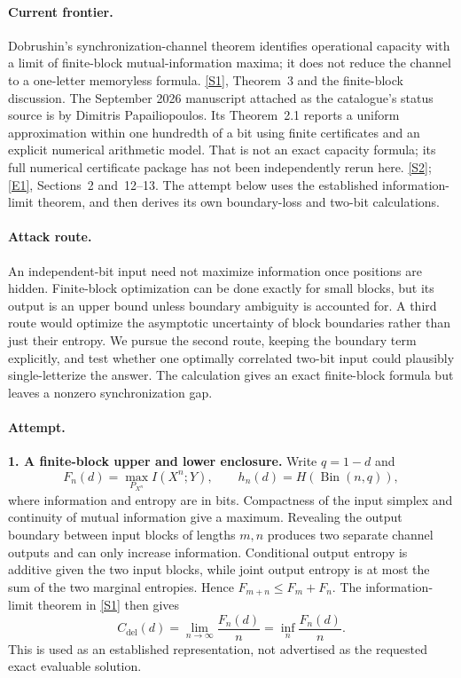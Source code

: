 \documentclass[11pt,a4paper]{article}
\newcommand{\sref}[2]{\hyperlink{source:#1:#2}{[S#2]}}
\newcommand{\eref}[2]{\hyperlink{extra:#1:#2}{[E#2]}}
\numberwithin{equation}{section}
\begin{document}
\paragraph{Current frontier.}
Dobrushin's synchronization-channel theorem identifies operational
capacity with a limit of finite-block mutual-information maxima; it
does not reduce the channel to a one-letter memoryless formula.
\sref{225}{1}, Theorem~3 and the finite-block discussion.
The September 2026 manuscript attached as the catalogue's status source
is by Dimitris Papailiopoulos. Its Theorem~2.1 reports a uniform
approximation within one hundredth of a bit using finite certificates
and an explicit numerical arithmetic model. That is not an exact capacity
formula; its full numerical certificate package has not been independently
rerun here. \sref{225}{2}; \eref{225}{1}, Sections~2 and~12--13.
The attempt below uses the established information-limit theorem, and
then derives its own boundary-loss and two-bit calculations.

\paragraph{Attack route.}
An independent-bit input need not maximize information once positions
are hidden. Finite-block optimization can be done exactly for small
blocks, but its output is an upper bound unless boundary ambiguity is
accounted for. A third route would optimize the asymptotic uncertainty
of block boundaries rather than just their entropy. We pursue the
second route, keeping the boundary term explicitly, and test whether
one optimally correlated two-bit input could plausibly single-letterize
the answer. The calculation gives an exact finite-block formula but
leaves a nonzero synchronization gap.

\paragraph{Attempt.}
\textbf{1. A finite-block upper and lower enclosure.}
Write $q=1-d$ and
\[
 F_n(d)=\max_{P_{X^n}}I(X^n;Y),\qquad
 h_n(d)=H(\operatorname{Bin}(n,q)),
\]
where information and entropy are in bits. Compactness of the input
simplex and continuity of mutual information give a maximum. Revealing
the output boundary between input blocks of lengths $m,n$ produces two
separate channel outputs and can only increase information. Conditional
output entropy is additive given the two input blocks, while joint
output entropy is at most the sum of the two marginal entropies. Hence
$F_{m+n}\le F_m+F_n$. The information-limit theorem in \sref{225}{1}
then gives
\[
 C_{\mathrm{del}}(d)=\lim_{n\to\infty}\frac{F_n(d)}n
                  =\inf_n\frac{F_n(d)}n.
\]
This is used as an established representation, not advertised as the
requested exact evaluable solution.
\end{document}
